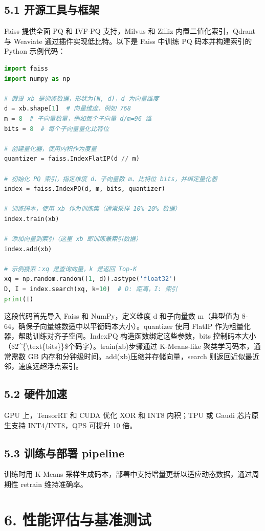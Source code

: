 \section{5.1 开源工具与框架}
Faiss 提供全面 PQ 和 IVF-PQ 支持，Milvus 和 Zilliz 内置二值化索引，Qdrant 与 Weaviate 通过插件实现低比特。以下是 Faiss 中训练 PQ 码本并构建索引的 Python 示例代码：\par
\begin{lstlisting}[language=python]
import faiss
import numpy as np

# 假设 xb 是训练数据，形状为(N, d)，d 为向量维度
d = xb.shape[1]  # 向量维度，例如 768
m = 8  # 子向量数量，例如每个子向量 d/m=96 维
bits = 8  # 每个子向量量化比特位

# 创建量化器，使用内积作为度量
quantizer = faiss.IndexFlatIP(d // m)

# 初始化 PQ 索引，指定维度 d、子向量数 m、比特位 bits，并绑定量化器
index = faiss.IndexPQ(d, m, bits, quantizer)

# 训练码本，使用 xb 作为训练集（通常采样 10%-20% 数据）
index.train(xb)

# 添加向量到索引（这里 xb 即训练兼索引数据）
index.add(xb)

# 示例搜索：xq 是查询向量，k 是返回 Top-K
xq = np.random.random((1, d)).astype('float32')
D, I = index.search(xq, k=10)  # D: 距离，I: 索引
print(I)
\end{lstlisting}
这段代码首先导入 Faiss 和 NumPy，定义维度 d 和子向量数 m（典型值为 8-64，确保子向量维数适中以平衡码本大小）。quantizer 使用 FlatIP 作为粗量化器，帮助训练对齐子空间。IndexPQ 构造函数绑定这些参数，bits 控制码本大小（\${}2\^{}\{{}\textbackslash{}text\{{}bits\}{}\}{}\${}个码字）。train(xb)步骤通过 K-Means-like 聚类学习码本，通常需数 GB 内存和分钟级时间。add(xb)压缩并存储向量，search 则返回近似最近邻，速度远超浮点索引。\par
\section{5.2 硬件加速}
GPU 上，TensorRT 和 CUDA 优化 XOR 和 INT8 内积；TPU 或 Gaudi 芯片原生支持 INT4/INT8，QPS 可提升 10 倍。\par
\section{5.3 训练与部署 pipeline}
训练时用 K-Means 采样生成码本，部署中支持增量更新以适应动态数据，通过周期性 retrain 维持准确率。\par
\chapter{6. 性能评估与基准测试}
